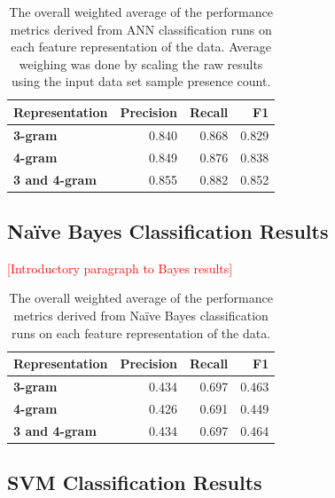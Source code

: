 \documentclass[conference]{sig-alternate-05-2015}
\newcommand{\todo}[1]{{\textcolor{red}{[#1]}}}
\begin{document}
\begin{table}[ht!]
  \centering
  \begin{tabular}{| l | r | r | r |}
    \hline
    \textbf{Representation} & \textbf{Precision} & \textbf{Recall} & \textbf{F1} \\
    \hline\hline
    \textbf{3-gram} & 0.840 & 0.868 & 0.829 \\
    \hline
    \textbf{4-gram} & 0.849 & 0.876 & 0.838 \\
    \hline
    \textbf{3 and 4-gram} & 0.855 & 0.882 & 0.852 \\
    \hline
  \end{tabular}
  \caption{The overall weighted average of the performance metrics derived from
  ANN classification runs on each feature representation of the data. Average
  weighing was done by scaling the raw results using the input data set sample
  presence count.}
  \label{tab:ann_overall_results}
\end{table}

\subsection{Na\"ive Bayes Classification Results}\label{subsec:bayes_results}

\todo{Introductory paragraph to Bayes results}

\begin{table}[ht!]
  \centering
  \begin{tabular}{| l | r | r | r |}
    \hline
    \textbf{Representation} & \textbf{Precision} & \textbf{Recall} & \textbf{F1} \\
    \hline\hline
    \textbf{3-gram} & 0.434 & 0.697 & 0.463 \\
    \hline
    \textbf{4-gram} & 0.426 & 0.691 & 0.449 \\
    \hline
    \textbf{3 and 4-gram} & 0.434 & 0.697 & 0.464 \\
    \hline
  \end{tabular}
  \caption{The overall weighted average of the performance metrics derived from
  Na\"ive Bayes classification runs on each feature representation of the data.}
  \label{tab:bayes_overall_results}
\end{table}

\subsection{SVM Classification Results}\label{subsec:svm_results}
\end{document}
